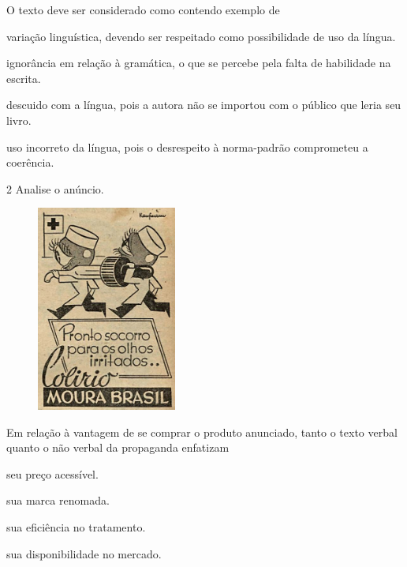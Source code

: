 
O texto deve ser considerado como contendo exemplo de

\begin{escolha}
\item variação linguística, devendo ser respeitado como possibilidade de
uso da língua.

\item ignorância em relação à gramática, o que se percebe pela falta de
habilidade na escrita.

\item descuido com a língua, pois a autora não se importou com o público
que leria seu livro.

\item uso incorreto da língua, pois o desrespeito à norma-padrão
comprometeu a coerência.
\end{escolha}

\num{2} Analise o anúncio.

\begin{figure}[H]
\centering
\includegraphics[width=1.81474in,height=2.66429in]{./imgSAEB_8_POR/media/image35.png}
\end{figure}


Em relação à vantagem de se comprar o produto anunciado, tanto o texto verbal
quanto o não verbal da propaganda enfatizam

\begin{escolha}
\item seu preço acessível.

\item sua marca renomada.

\item sua eficiência no tratamento.

\item sua disponibilidade no mercado.
\end{escolha}

